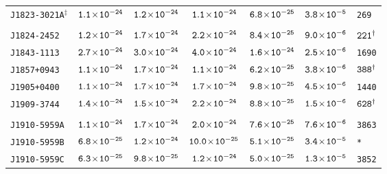 \begin{longtable}{l | c | c | c | c | c | l}
\scriptsize{\tt{J1823-3021A}$^{\ddagger}$} & \scriptsize{$\tt{1.1\!\times\!10^{-24}}$} &
\scriptsize{$\tt{1.2\!\times\!10^{-24}}$} & \scriptsize{$\tt{1.1\!\times\!10^{-24}}$} &\scriptsize{$\tt{6.8\!\times\!10^{-25}}$} &
\scriptsize{$\tt{3.8\!\times\!10^{-5}}$} & \scriptsize{\tt{269}} \\[-16pt] 
\\[-20pt] 
\scriptsize{\tt{J1824-2452}} & \scriptsize{$\tt{1.2\!\times\!10^{-24}}$} & \scriptsize{$\tt{1.7\!\times\!10^{-24}}$} & \scriptsize{$\tt{2.2\!\times\!10^{-24}}$} & \scriptsize{$\tt{8.4\!\times\!10^{-25}}$} & \scriptsize{$\tt{9.0\!\times\!10^{-6}}$} & \scriptsize{$\tt{221^{\dagger}}$} \\[-16pt] 
\scriptsize{\tt{J1843-1113}} & \scriptsize{$\tt{2.7\!\times\!10^{-24}}$} & \scriptsize{$\tt{3.0\!\times\!10^{-24}}$} & \scriptsize{$\tt{4.0\!\times\!10^{-24}}$} &\scriptsize{$\tt{1.6\!\times\!10^{-24}}$} & \scriptsize{$\tt{2.5\!\times\!10^{-6}}$} & \scriptsize{\tt{1690}} \\[-16pt] 
\scriptsize{\tt{J1857+0943}} & \scriptsize{$\tt{1.1\!\times\!10^{-24}}$} & \scriptsize{$\tt{1.7\!\times\!10^{-24}}$} & \scriptsize{$\tt{1.1\!\times\!10^{-24}}$} & \scriptsize{$\tt{6.2\!\times\!10^{-25}}$} & \scriptsize{$\tt{3.8\!\times\!10^{-6}}$} & \scriptsize{$\tt{388^{\dagger}}$} \\[-16pt] 
\scriptsize{\tt{J1905+0400}} & \scriptsize{$\tt{1.1\!\times\!10^{-24}}$} & \scriptsize{$\tt{1.7\!\times\!10^{-24}}$} & \scriptsize{$\tt{1.7\!\times\!10^{-24}}$} &\scriptsize{$\tt{9.8\!\times\!10^{-25}}$} & \scriptsize{$\tt{4.5\!\times\!10^{-6}}$} & \scriptsize{\tt{1440}} \\[-16pt] 
\scriptsize{\tt{J1909-3744}} & \scriptsize{$\tt{1.4\!\times\!10^{-24}}$} & \scriptsize{$\tt{1.5\!\times\!10^{-24}}$} & \scriptsize{$\tt{2.2\!\times\!10^{-24}}$} & \scriptsize{$\tt{8.8\!\times\!10^{-25}}$} & \scriptsize{$\tt{1.5\!\times\!10^{-6}}$} & \scriptsize{$\tt{628^{\dagger}}$} \\[-16pt] 
\\[-20pt] 
\scriptsize{\tt{J1910-5959A}} & \scriptsize{$\tt{1.1\!\times\!10^{-24}}$} & \scriptsize{$\tt{1.7\!\times\!10^{-24}}$} & \scriptsize{$\tt{2.0\!\times\!10^{-24}}$} &\scriptsize{$\tt{7.6\!\times\!10^{-25}}$} & \scriptsize{$\tt{7.6\!\times\!10^{-6}}$} & \scriptsize{\tt{3863}} \\[-16pt] 
\scriptsize{\tt{J1910-5959B}} & \scriptsize{$\tt{6.8\!\times\!10^{-25}}$} & \scriptsize{$\tt{1.2\!\times\!10^{-24}}$} & \scriptsize{$\tt{10.0\!\times\!10^{-25}}$} & \scriptsize{$\tt{5.1\!\times\!10^{-25}}$} & \scriptsize{$\tt{3.4\!\times\!10^{-5}}$} & \scriptsize{\tt{*}} \\[-16pt] 
\scriptsize{\tt{J1910-5959C}} & \scriptsize{$\tt{6.3\!\times\!10^{-25}}$} & \scriptsize{$\tt{9.8\!\times\!10^{-25}}$} & \scriptsize{$\tt{1.2\!\times\!10^{-24}}$} &\scriptsize{$\tt{5.0\!\times\!10^{-25}}$} & \scriptsize{$\tt{1.3\!\times\!10^{-5}}$} & \scriptsize{\tt{3852}} \\[-16pt] 

\end{longtable}
